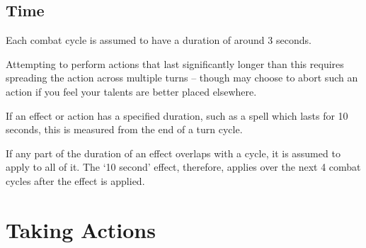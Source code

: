






\subsection{Time}

Each combat cycle is assumed to have a duration of around 3 seconds. 

Attempting to perform actions that last significantly longer than this requires spreading the action across multiple turns -- though may choose to abort such an action if you feel your talents are better placed elsewhere. 

If an effect or action has a specified duration, such as a spell which lasts for 10 seconds, this is measured from the end of a turn cycle.

If any part of the duration of an effect overlaps with a cycle, it is assumed to apply to all of it. The `10 second' effect, therefore, applies over the next 4 combat cycles after the effect is applied. 


 \section{Taking Actions} \label{S:CombatActions}
 
